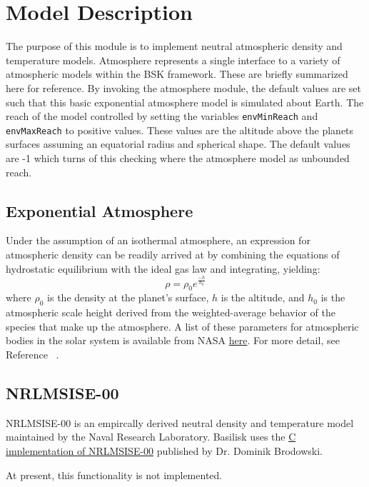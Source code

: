 
\section{Model Description}

The purpose of this module is to implement neutral atmospheric density and temperature models.
Atmosphere represents a single interface to a variety of atmospheric models within the BSK framework. These are briefly summarized here for reference.
By invoking the atmosphere module, the default values are set such that this basic exponential atmosphere model is simulated about Earth.
The reach of the model controlled by setting the variables {\tt envMinReach} and {\tt envMaxReach} to positive values.  These values are the altitude above the planets surfaces assuming an equatorial radius and spherical shape.  The default values are -1 which turns of this checking where the atmosphere model as unbounded reach.  

\subsection{Exponential Atmosphere}
Under the assumption of an isothermal atmosphere, an expression for atmospheric density can be readily arrived at by combining the equations of hydrostatic equilibrium with the ideal gas law and integrating, yielding:
\begin{equation}
\label{eq:expAtmo}
\rho = \rho_0 e^{\frac{-h}{h_0}}
\end{equation}
where $\rho_0$ is the density at the planet's surface, $h$ is the altitude, and $h_0$ is the atmospheric scale height derived from the weighted-average behavior of the species that make up the atmosphere. A list of these parameters
for atmospheric bodies in the solar system is available from NASA \href{https://nssdc.gsfc.nasa.gov/planetary/planetfact.html}{here}. For more detail, see Reference ~. 


\subsection{NRLMSISE-00}
NRLMSISE-00 is an empircally derived neutral density and temperature model maintained by the Naval Research Laboratory. Basilisk uses the \href{https://www.brodo.de/space/nrlmsise/index.html}{C implementation of NRLMSISE-00} published by Dr. Dominik Brodowski.

At present, this functionality is not implemented.